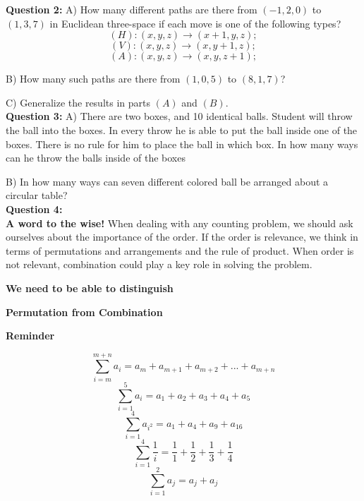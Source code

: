 \documentclass[11pt]{article}
\begin{document}
\textbf{Question 2:}  A) How many different paths are there from $(-1,2,0)$ to $(1,3,7)$ in Euclidean three-space if each move is one of the following types? %
$$(H):(x,y,z)\rightarrow(x+1,y,z);$$
$$(V):(x,y,z)\rightarrow(x,y+1,z);$$
$$(A):(x,y,z)\rightarrow(x,y,z+1);$$

B) How many such paths are there from $(1,0,5)$ to $(8,1,7)$?

C) Generalize the results in parts $(A)$ and $(B)$.
\\

\textbf{Question 3:} A) There are two boxes, and 10 identical balls. Student will throw the 
ball into the boxes. In every throw he is able to put the ball inside one of the boxes. There 
is no rule for him to place the ball in which box. In how many ways can he throw the balls 
inside of the boxes %

B) In how many ways can seven different colored ball be arranged about a circular table? 
\\ %

\textbf{Question 4:}  
\\

\textbf{A word to the wise!} When dealing with any counting problem, we should ask 
ourselves about the importance of the order. If the order is relevance, we think in terms of 
permutations and arrangements and the rule of product. When order is not relevant, 
combination could play a key role in solving the problem.
\\

\begin{center}
\textbf{We need to be able to distinguish}

\textbf{Permutation from Combination}
\end{center}


\begin{center}
\textbf{Reminder}
\end{center}

$$\sum\limits_{i = m}^{m+n}{a_i = a_m+a_{m+1}+a_{m+2}+...+a_{m+n}}$$
$$\sum\limits_{i = 1}^5{a_i = a_1+a_2+a_3+a_4+a_5}$$
$$\sum\limits_{i = 1}^4{a_{i^2} = a_1+a_4+a_9+a_{16}}$$
$$\sum\limits_{i = 1}^4{\frac{1}{i} =\frac{1}{1}+\frac{1}{2}+\frac{1}{3}+\frac{1}{4}}$$
$$\sum\limits_{i = 1}^2{a_j = a_j+a_j}$$
\\
\end{document}
